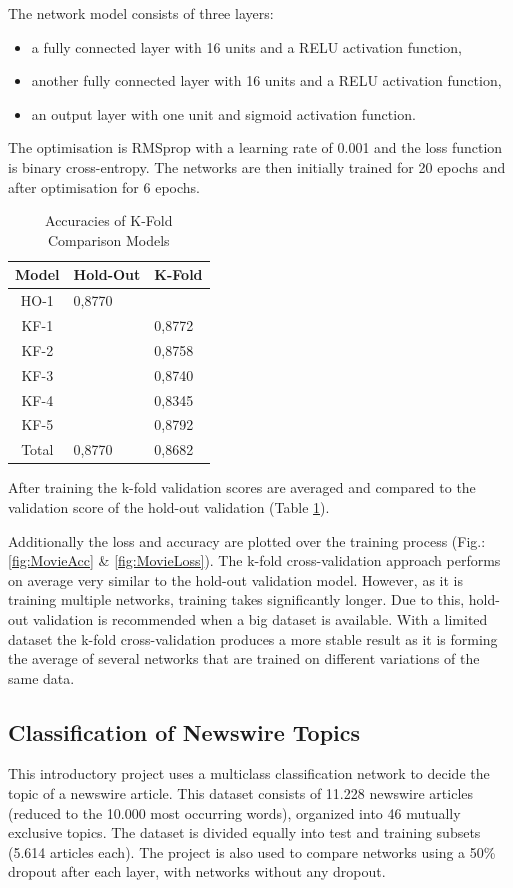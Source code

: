 \documentclass[sigconf]{acmart}
\begin{document}
The network model consists of three layers:
\begin{itemize}
\item a fully connected layer with 16 units and a RELU activation function,
\item another fully connected layer with 16 units and a RELU activation function,
\item an output layer with one unit and sigmoid activation function.
\end{itemize}
The optimisation is RMSprop with a learning rate of 0.001 and the loss function is binary cross-entropy.
The networks are then initially trained for 20 epochs and after optimisation for 6 epochs.

\begin{table}[h]
  \caption{Accuracies of K-Fold Comparison Models}
  \label{tab:kfoldAccuracy}
  \begin{tabular}{ c | l l }
    \toprule
    Model & Hold-Out & K-Fold\\
    \midrule
    HO-1 & 0,8770 &        \\
	KF-1 &        & 0,8772 \\
	KF-2 &        & 0,8758 \\
	KF-3 &        & 0,8740 \\
	KF-4 &        & 0,8345 \\
	KF-5 &        & 0,8792 \\
	\midrule
	Total & 0,8770 & 0,8682 \\
  	\bottomrule
  \end{tabular}
\end{table}

After training the k-fold validation scores are averaged and compared to the validation score of the hold-out validation (Table \ref{tab:kfoldAccuracy}).

Additionally the loss and accuracy are plotted over the training process (Fig.: \ref{fig:MovieAcc} \& \ref{fig:MovieLoss}).
The k-fold cross-validation approach performs on average very similar to the hold-out validation model.
However, as it is training multiple networks, training takes significantly longer.
Due to this, hold-out validation is recommended when a big dataset is available.
With a limited dataset the k-fold cross-validation produces a more stable result as it is forming the average of several networks that are trained on different variations of the same data.

\subsection{Classification of Newswire Topics}
This introductory project uses a multiclass classification network to decide the topic of a newswire article.
This dataset consists of 11.228 newswire articles (reduced to the 10.000 most occurring words), organized into 46 mutually exclusive topics.
The dataset is divided equally into test and training subsets (5.614 articles each).
The project is also used to compare networks using a 50\% dropout after each layer, with networks without any dropout.
\end{document}
